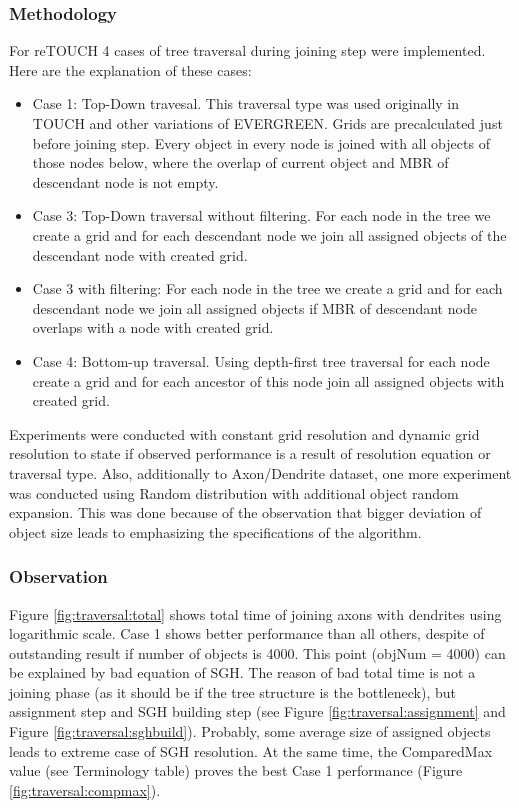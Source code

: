 \documentclass{sig-alternate}
\newcommand{\fref}[1]{Figure \ref{#1}}
\begin{document}
\subsubsection{Methodology}
For reTOUCH 4 cases of tree traversal during joining step were implemented. Here are the explanation of these cases:
\begin{itemize}
\item Case 1: Top-Down travesal. This traversal type was used originally in TOUCH and other variations of EVERGREEN. Grids are precalculated just before joining step. Every object in every node is joined with all objects of those nodes below, where the overlap of current object and MBR of descendant node is not empty.
\item Case 3: Top-Down traversal without filtering. For each node in the tree we create a grid and for each descendant node we join all assigned objects of the descendant node with created grid.
\item Case 3 with filtering: For each node in the tree we create a grid and for each descendant node we join all assigned objects if MBR of descendant node overlaps with a node with created grid.
\item Case 4: Bottom-up traversal. Using depth-first tree traversal for each node create a grid and for each ancestor of this node join all assigned objects with created grid.
\end{itemize}

Experiments were conducted with constant grid resolution and dynamic grid resolution to state if observed performance is a result of resolution equation or traversal type. Also, additionally to Axon/Dendrite dataset, one more experiment was conducted using Random distribution with additional object random expansion. This was done because of the observation that bigger deviation of object size leads to emphasizing the specifications of the algorithm.

\subsubsection{Observation}

\fref{fig:traversal:total} shows total time of joining axons with dendrites using logarithmic scale. Case 1 shows better performance than all others, despite of outstanding result if number of objects is 4000. 
This point (objNum = 4000) can be explained by bad equation of SGH. The reason of bad total time is not a joining phase (as it should be if the tree structure is the bottleneck), but assignment step and SGH building step (see \fref{fig:traversal:assignment} and \fref{fig:traversal:sghbuild}). Probably, some average size of assigned objects leads to extreme case of SGH resolution. At the same time, the ComparedMax value (see Terminology table) proves the best Case 1 performance (\fref{fig:traversal:compmax}).
\end{document}
